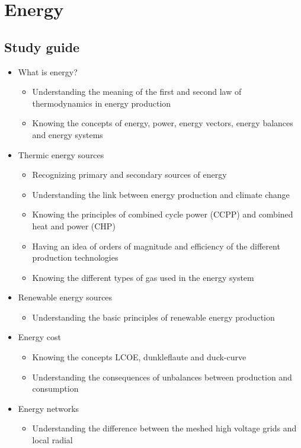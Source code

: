 \documentclass[../summary.tex]{subfiles}
\begin{document}
	
	\section{Energy}
	
	\subsection{Study guide}
	\begin{itemize} 
		\setlength{\itemsep}{0pt}
		\item What is energy?
		\begin{itemize}
			\item Understanding the meaning of the first and second law of thermodynamics in energy production
			\item Knowing the concepts of energy, power, energy vectors, energy balances and energy systems
		\end{itemize}
		\item Thermic energy sources
		\begin{itemize}
			\item Recognizing primary and secondary sources of energy
			\item Understanding the link between energy production and climate change
			\item Knowing the principles of combined cycle power (CCPP) and combined heat and power (CHP)
			\item Having an idea of orders of magnitude and efficiency of the different production technologies
			\item Knowing the different types of gas used in the energy system
		\end{itemize}
		\item Renewable energy sources
		\begin{itemize}
			\item Understanding the basic principles of renewable energy production
		\end{itemize}
		\item Energy cost
		\begin{itemize}
			\item Knowing the concepts LCOE, dunkleflaute and duck-curve
			\item Understanding the consequences of unbalances between production and consumption
		\end{itemize}
		\item Energy networks
		\begin{itemize}
			\item Understanding the difference between the meshed high voltage grids and local radial 
			

\end{itemize}
\end{itemize}
\end{document}

